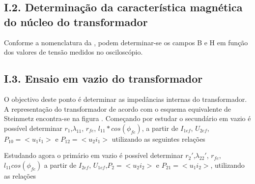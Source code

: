 \documentclass[%
  reprint,
  nofootinbib,
  amsmath,amssymb,
  aps,
  10pt,
]{revtex4-1}
\begin{document}
\subsection*{I.2. Determinação da característica magnética do núcleo do transformador}
Conforme a nomenclatura da , podem determinar-se os campos B e H em função dos valores de tensão medidos no osciloscópio.



\subsection*{I.3. Ensaio em vazio do transformador}
O objectivo deste ponto é determinar as impedâncias internas do transformador. A representação do transformador de acordo com o esquema equivalente de Steinmetz encontra-se na figura .
Começando por estudar o secundário em vazio é possível determinar $r_1$,$\lambda_{11}$, $r_{fe}$, $l_{11}*cos(\phi_{fe})$, a partir de $I_{1ef}$, $U_{2ef}$, $P_{10}=<u_1 i_1>$ e $P_{12}=<u_2 i_1>$ utilizando as seguintes relações






Estudando agora o primário em vazio é possível determinar $r_2'$,$\lambda_{22}'$, $r_{fe}$, $l_{11}cos(\phi_{fe})$ a partir de $I_{2ef}$, $U_{1ef}$,$P_{2}=<u_2 i_2>$ e $P_{21}=<u_1 i_2>$, utilizando as relações




\end{document}
